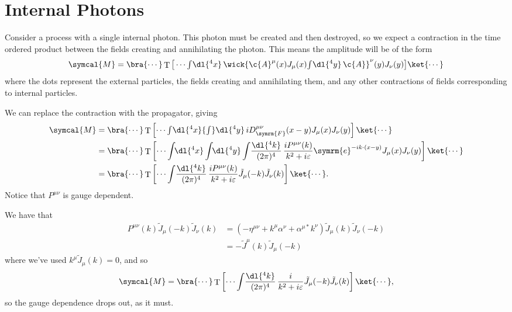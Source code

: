 \documentclass[fleqn]{NotesClass}
\newcommand{\minkowskiMetric}{\eta}
\newcommand{\e}{\symrm{e}}
\DeclareMathOperator{\timeOrdering}{T}
\newcommand{\feynman}{\symrm{F}}
\newcommand{\amplitude}{\symcal{M}}
\begin{document}
    \section{Internal Photons}
    Consider a process with a single internal photon.
    This photon must be created and then destroyed, so we expect a contraction in the time ordered product between the fields creating and annihilating the photon.
    This means the amplitude will be of the form
    \begin{equation}
        \amplitude = \bra{\cdots} \timeOrdering\big[ \cdots {\textstyle \int} \dl{^4x} \, \wick{\c{A}^\mu(x) J_\mu(x) {\textstyle \int} \dl{^4y} \, \c{A}}^\nu(y) J_\nu(y) \big] \ket{\cdots}
    \end{equation}
    where the dots represent the external particles, the fields creating and annihilating them, and any other contractions of fields corresponding to internal particles.
    
    We can replace the contraction with the propagator, giving
    \begin{align}
        \amplitude &= \bra{\cdots} \timeOrdering\left[ \cdots {\textstyle \int} \dl{^4x} {\textstyle \int} \dl{^4y} \,  i D_{\feynman}^{\mu\nu}(x - y) J_\mu(x) J_\nu(y) \right] \ket{\cdots}\\
        &= \bra{\cdots} \timeOrdering\left[ \cdots \int \!\! \dl{^4x} \int \!\! \dl{^4y} \int \! \frac{\dl{^4k}}{(2\pi)^4} \,  \frac{iP^{\mu\nu}(k)}{k^2 + i\varepsilon} \e^{-ik\cdot (x - y)} J_\mu(x) J_\nu(y) \right] \ket{\cdots} \notag\\
        &= \bra{\cdots} \timeOrdering\left[ \cdots \int \! \frac{\dl{^4k}}{(2\pi)^4} \,  \frac{iP^{\mu\nu}(k)}{k^2 + i\varepsilon} \tilde{J}_\mu(-k) \tilde{J}_\nu(k) \right] \ket{\cdots}.
    \end{align}
    Notice that \(P^{\mu\nu}\) is gauge dependent.
    
    We have that
    \begin{align}
        P^{\mu\nu}(k) \tilde{J}_\mu(-k)\tilde{J}_\nu(k) &= (-\minkowskiMetric^{\mu\nu} + k^\mu \alpha^\nu + \alpha^{\mu*}k^\nu) \tilde{J}_\mu(k) \tilde{J}_\nu(-k)\\
        &= -\tilde{J}^\mu(k) \tilde{J}_\mu(-k)
    \end{align}
    where we've used \(k^\mu \tilde{J}_\mu(k) = 0\), and so
    \begin{equation}
        \amplitude = \bra{\cdots} \timeOrdering\left[ \cdots \int \! \frac{\dl{^4k}}{(2\pi)^4} \,  \frac{i}{k^2 + i\varepsilon} \tilde{J}_\mu(-k) \tilde{J}_\nu(k) \right] \ket{\cdots},
    \end{equation}
    so the gauge dependence drops out, as it must.
    
\end{document}
